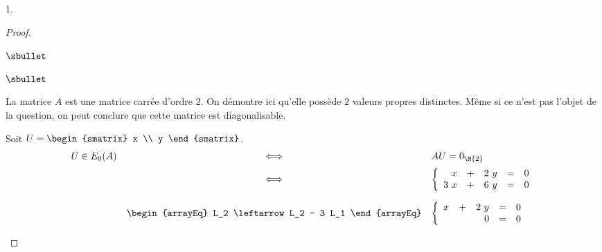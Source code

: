 \documentclass[11pt]{article}%
\begin{document}
\begin{noliste}{1.}
\begin{proof}
\begin{noliste}{$\sbullet$}
\begin{remark}
\begin{noliste}{$\sbullet$}
      \item La matrice $A$ est une matrice carrée d'ordre $2$. On
        démontre ici qu'elle possède $2$ valeurs propres
        distinctes. Même si ce n'est pas l'objet de la question, on
        peut conclure que cette matrice est diagonalisable.
      \end{noliste}

    \end{remark}

    \item Soit $U =
      \begin{smatrix}
        x \\
        y
      \end{smatrix}
      $.
      \[
      \begin{array}{rcl}
        U \in E_0(A) & \Longleftrightarrow & AU = 0_{\M{2}}
        \\[.2cm]
        & \Longleftrightarrow & 
        \left\{
          \begin{array}{rcrcl}
            x & + & 2 \ y & = & 0 \\
            3 \ x & + & 6 \ y & = & 0 
          \end{array}
        \right.
        \\[.6cm]
        &
        \begin{arrayEq}
          L_2 \leftarrow L_2 - 3 L_1 
        \end{arrayEq}
        & 
        \left\{
          \begin{array}{rcrcl}
            x & + & 2 \ y & = & 0 \\
            & & 0 & = & 0 
          \end{array}
        \right.
      \end{array}
      \]


      \newpage



\end{noliste}
\end{proof}
\end{noliste}
\end{document}
